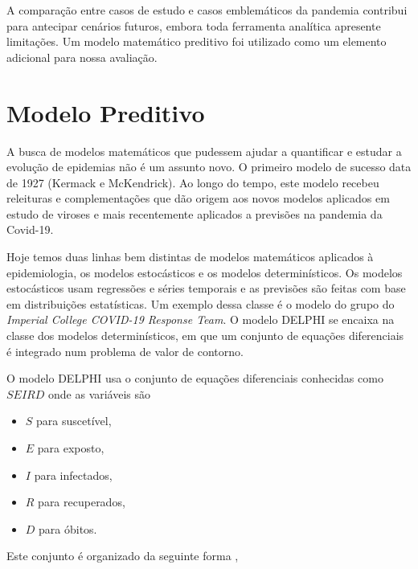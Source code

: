 \documentclass[12pt]{article}
\begin{document}
A comparação entre casos de estudo e casos emblemáticos da pandemia contribui para antecipar cenários futuros, embora toda ferramenta analítica apresente limitações. Um modelo matemático preditivo foi utilizado como um elemento adicional para nossa avaliação.

\section{Modelo Preditivo}


A busca de modelos matemáticos que pudessem ajudar a quantificar e estudar a evolução de epidemias não é um assunto novo. O primeiro modelo de sucesso data de 1927 (Kermack e McKendrick)\cite{doi:10.1098/rspa.1927.0118}. Ao longo do tempo, este modelo recebeu releituras e complementações que dão origem aos novos modelos aplicados em estudo de viroses e mais recentemente aplicados a previsões na pandemia da Covid-19. 

Hoje temos duas linhas bem distintas de modelos matemáticos aplicados à epidemiologia, os modelos estocásticos e os modelos determinísticos. Os modelos estocásticos usam regressões e séries temporais e as previsões são feitas com base em distribuições estatísticas. Um exemplo dessa classe é o modelo do grupo do \textit{Imperial College COVID-19 Response Team}\cite{impirial1}. O modelo DELPHI\cite{delphi} se encaixa na classe dos modelos determinísticos, em que um conjunto de equações diferenciais é integrado num problema de valor de contorno\cite{2008elementary}. 

O modelo DELPHI usa o conjunto de equações diferenciais conhecidas como $SEIRD$ onde as variáveis  são 
\begin{itemize}
\item $S$ para suscetível,
\item $E$ para exposto,
\item $I$ para infectados,
\item $R$ para recuperados,
\item $D$ para óbitos.
\end{itemize}
Este conjunto é organizado da seguinte forma ,
\end{document}
